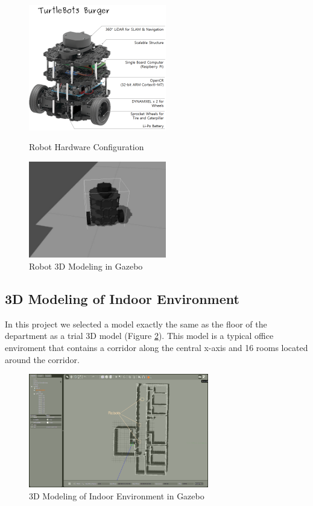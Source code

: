 \begin{figure}[htbp]
\centering
\begin{minipage}[t]{0.48\textwidth}
\centering
\includegraphics[width=6cm]{content/images/ch2/turtlebot3_burger_components.png}
\caption{Robot Hardware Configuration}
\label{fig:robot_hardware}
\end{minipage}
\begin{minipage}[t]{0.48\textwidth}
\centering
\includegraphics[width=6cm]{content/images/ch2/robot_model.jpg}
\caption{Robot 3D Modeling in Gazebo}
\label{fig:simulated_robot}
\end{minipage}
\end{figure}

\subsection{3D Modeling of Indoor Environment}

In this project we selected a model exactly the same as the floor of the department as a trial 3D model (Figure \ref{fig:modeling_environment_gazebo}).
This model is a typical office enviroment that contains a corridor along the central x-axis and 16 rooms located around the corridor. 

\begin{figure}[htbp]
    \centering
    \includegraphics[width = 0.7\textwidth]{content/images/ch2/gazebo_gui_environment.png}
    \caption{3D Modeling of Indoor Environment in Gazebo}
    \label{fig:modeling_environment_gazebo}
\end{figure}

